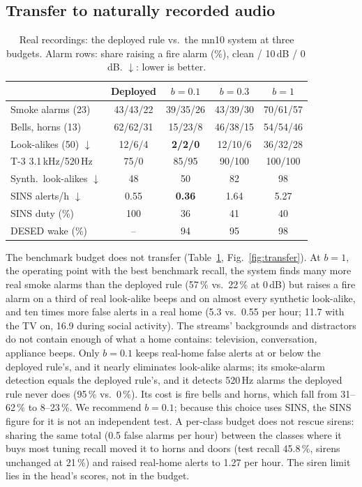 \documentclass[conference]{IEEEtran}
\begin{document}
\subsection{Transfer to naturally recorded audio}\label{sec:transfer}
\begin{table}[t]
\centering\caption{Real recordings: the deployed rule vs.\ the mn10 system at three budgets. Alarm rows: share raising a fire
alarm (\%), clean / 10\,dB / 0\,dB. $\downarrow$: lower is better.}\label{tab:real}
\small\setlength{\tabcolsep}{2pt}
\begin{tabular}{lcccc}
\toprule
 & Deployed & $b=0.1$ & $b=0.3$ & $b=1$ \\
\midrule
Smoke alarms (23) & 43/43/22 & 39/35/26 & 43/39/30 & 70/61/57 \\
Bells, horns (13) & 62/62/31 & 15/23/8 & 46/38/15 & 54/54/46 \\
Look-alikes (50) $\downarrow$ & 12/6/4 & \textbf{2/2/0} & 12/10/6 & 36/32/28 \\
T-3 3.1\,kHz/520\,Hz & 75/0 & 85/95 & 90/100 & 100/100 \\
Synth.\ look-alikes $\downarrow$ & 48 & 50 & 82 & 98 \\
SINS alerts/h $\downarrow$ & 0.55 & \textbf{0.36} & 1.64 & 5.27 \\
SINS duty (\%) & 100 & 36 & 41 & 40 \\
DESED wake (\%) & -- & 94 & 95 & 98 \\
\bottomrule
\end{tabular}
\end{table}

The benchmark budget does not transfer (Table~\ref{tab:real}, Fig.~\ref{fig:transfer}). At $b=1$, the operating point
with the best benchmark recall, the system finds many more real smoke alarms than the deployed rule (57\,\% vs.\ 22\,\% at 0\,dB) but
raises a fire alarm on a third of real look-alike beeps and on almost every synthetic look-alike, and ten times more false
alerts in a real home (5.3 vs.\ 0.55 per hour; 11.7 with the TV on, 16.9 during social activity). The streams' backgrounds and
distractors do not contain enough of what a home contains: television, conversation, appliance beeps. Only $b=0.1$ keeps
real-home false alerts at or below the deployed rule's, and it nearly eliminates look-alike alarms; its smoke-alarm
detection equals the deployed rule's, and it detects 520\,Hz alarms the deployed rule never does (95\,\% vs.\ 0\,\%). Its cost is fire bells and horns,
which fall from 31--62\,\% to 8--23\,\%. We recommend $b=0.1$; because this choice uses SINS, the SINS figure for it is not an
independent test. A per-class budget does not rescue sirens: sharing the same total (0.5 false alarms per hour) between the
classes where it buys most tuning recall moved it to horns and doors (test recall 45.8\,\%, sirens unchanged at 21\,\%) and
raised real-home alerts to 1.27 per hour. The siren limit lies in the head's scores, not in the budget.
\end{document}
